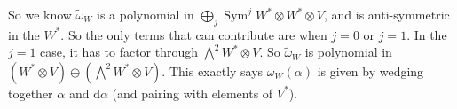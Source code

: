 \documentclass{shortart}
\theoremstyle{definition}
\DeclareMathOperator\Sym{Sym}
\newcommand\exterior{{\textstyle \bigwedge}}
\renewcommand\d{\mathrm{d}}
\begin{document}
So we know $\tilde{\omega}_W$ is a polynomial in $\bigoplus_j \Sym^j W^* \otimes W^* \otimes V$, and is anti-symmetric in the $W^*$. So the only terms that can contribute are when $j = 0$ or $j = 1$. In the $j = 1$ case, it has to factor through $\exterior^2 W^* \otimes V$. So $\tilde{\omega}_W$ is polynomial in $(W^* \otimes V) \oplus (\exterior^2 W^* \otimes V)$. This exactly says $\omega_W(\alpha)$ is given by wedging together $\alpha$ and $\d \alpha$ (and pairing with elements of $V^*$).
\end{document}
